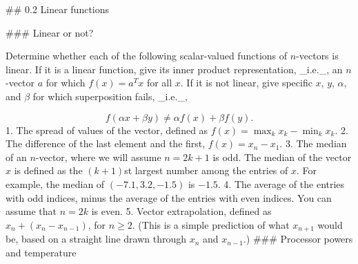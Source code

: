 

## 0.2 Linear functions

### Linear or not?

Determine whether each of the following scalar-valued functions of \(n\)-vectors is linear. If it is a linear function, give its inner product representation, _i.e._, an \(n\)-vector \(a\) for which \(f(x)=a^{T}x\) for all \(x\). If it is not linear, give specific \(x\), \(y\), \(\alpha\), and \(\beta\) for which superposition fails, _i.e._,

\[f(\alpha x+\beta y)\neq\alpha f(x)+\beta f(y).\] 1. The spread of values of the vector, defined as \(f(x)=\max_{k}x_{k}-\min_{k}x_{k}\). 2. The difference of the last element and the first, \(f(x)=x_{n}-x_{1}\). 3. The median of an \(n\)-vector, where we will assume \(n=2k+1\) is odd. The median of the vector \(x\) is defined as the \((k+1)\)st largest number among the entries of \(x\). For example, the median of \((-7.1,3.2,-1.5)\) is \(-1.5\). 4. The average of the entries with odd indices, minus the average of the entries with even indices. You can assume that \(n=2k\) is even. 5. Vector extrapolation, defined as \(x_{n}+(x_{n}-x_{n-1})\), for \(n\geq 2\). (This is a simple prediction of what \(x_{n+1}\) would be, based on a straight line drawn through \(x_{n}\) and \(x_{n-1}\).) ### Processor powers and temperature

